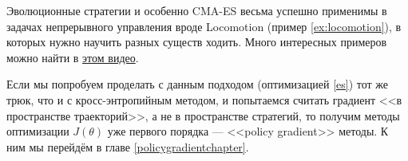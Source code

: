 \begin{example}
Эволюционные стратегии и особенно CMA-ES весьма успешно применимы в задачах непрерывного управления вроде Locomotion (пример \ref{ex:locomotion}), в которых нужно научить разных существ ходить. Много интересных примеров можно найти в \href{https://www.youtube.com/watch?v=pgaEE27nsQw}{этом видео}.
\end{example}

Если мы попробуем проделать с данным подходом (оптимизацией \eqref{es}) тот же трюк, что и с кросс-энтропийным методом, и попытаемся считать градиент <<в пространстве траекторий>>, а не в пространстве стратегий, то получим методы оптимизации $J(\theta)$ уже первого порядка --- <<policy gradient>> методы. К ним мы перейдём в главе \ref{policygradientchapter}.